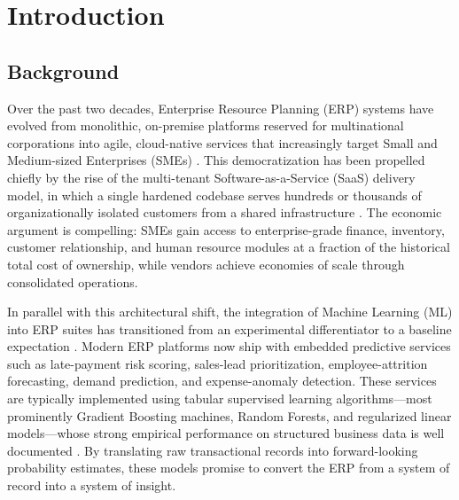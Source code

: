 %
%
\chapter{Introduction}
\label{ch:introduction}

\section{Background}
\label{sec:background}

Over the past two decades, Enterprise Resource Planning (ERP) systems have evolved from monolithic, on-premise platforms reserved for multinational corporations into agile, cloud-native services that increasingly target Small and Medium-sized Enterprises (SMEs) \citep{haddara2011erp, gartner2023erp}. This democratization has been propelled chiefly by the rise of the multi-tenant Software-as-a-Service (SaaS) delivery model, in which a single hardened codebase serves hundreds or thousands of organizationally isolated customers from a shared infrastructure \citep{bezemer2010multi, krebs2014multitenancy}. The economic argument is compelling: SMEs gain access to enterprise-grade finance, inventory, customer relationship, and human resource modules at a fraction of the historical total cost of ownership, while vendors achieve economies of scale through consolidated operations.

In parallel with this architectural shift, the integration of Machine Learning (ML) into ERP suites has transitioned from an experimental differentiator to a baseline expectation \citep{idc2024ai}. Modern ERP platforms now ship with embedded predictive services such as late-payment risk scoring, sales-lead prioritization, employee-attrition forecasting, demand prediction, and expense-anomaly detection. These services are typically implemented using tabular supervised learning algorithms---most prominently Gradient Boosting machines, Random Forests, and regularized linear models---whose strong empirical performance on structured business data is well documented \citep{chen2016xgboost, lundberg2020local}. By translating raw transactional records into forward-looking probability estimates, these models promise to convert the ERP from a system of record into a system of insight.

